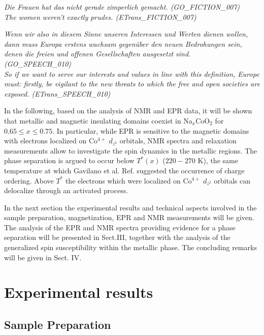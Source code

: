 \documentclass[prb,showpacs,preprintnumbers,amsmath,amssymb,floatfix]{revtex4}
\begin{document}
\ea \label{ex:culo:25}
  \ea 
\textit{Die Frauen hat das nicht gerade zimperlich gemacht. \textup{(GO\_FICTION\_007)}}\\
   \ex \textit{The women weren't exactly prudes. \textup{(ETrans\_FICTION\_007)}}
   \z
\z


\ea \label{ex:culo:26}
   \ea
\textit{Wenn wir also in diesem Sinne unseren Interessen und Werten dienen wollen, dann   muss Europa erstens wachsam gegenüber den neuen Bedrohungen sein, denen die   freien und offenen Gesellschaften ausgesetzt sind. \textup{(GO\_SPEECH\_010)}}\\
   \ex 
   \textit{So if we want to serve our interests and values in line with this definition, Europe must:   firstly, be vigilant to the new threats to which the free and open societies are exposed.   \textup{(ETrans\_SPEECH\_010)}}
   \z
\z









In the following, based on the analysis of NMR and EPR data, it
will be shown that metallic and magnetic insulating domains
coexist in Na$_x$CoO$_2$ for $0.65\leq x\leq 0.75$. In particular,
while EPR is sensitive to the magnetic domains with electrons
localized on Co$^{4+}$ $d_{z^2}$ orbitals, NMR spectra and
relaxation measurements allow to investigate the spin dynamics in
the metallic regions. The phase separation is argued to occur
below $T^*(x)$ ($220- 270$ K), the same temperature at which
Gavilano et al. Ref. suggested the occurrence
of charge ordering. Above $T^*$ the electrons which were localized
on Co$^{4+}$ $d_{z^2}$ orbitals can delocalize through an
activated process.

In the next section the experimental results and technical aspects
involved in the sample preparation, magnetization, EPR and NMR
measurements will be given. The analysis of the EPR and NMR
spectra providing evidence for a phase separation will be
presented in Sect.III, together with the analysis of the
generalized spin susceptibility within the metallic phase. The
concluding remarks will be given in Sect. IV.


\section{Experimental results}

\subsection{Sample Preparation}
\end{document}
